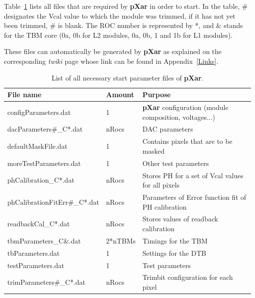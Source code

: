 \documentclass[a4paper,12pt,twoside]{article}
\begin{document}
\begin{appendices}
Table~\ref{StartParameters} lists all files that are required by \textbf{pXar} in order to start. In the table, \# designates the Vcal value to which the module was trimmed, if it has not yet been trimmed, \# is blank. The ROC number is represented by *, and \& stands for the TBM core (0a, 0b for L2 modules, 0a, 0b, 1 and 1b for L1 modules).

These files can automatically be generated by \textbf{pXar} as explained on the corresponding \textit{twiki} page whose link can be found in Appendix~\ref{Links}.

\begin{table}[h!]
\centering \advance\leftskip-0.9cm
\caption{List of all necessary start parameter files of \textbf{pXar}.}
\label{StartParameters}
\begin{tabular}{@{}lll@{}}
\toprule
File name                     & Amount  & Purpose                                                     \\ \midrule
configParameters.dat          & 1       & \textbf{pXar} configuration (module composition, voltages...) \\
dacParameters\#\_C*.dat       & nRocs   & DAC parameters                                              \\
defaultMaskFile.dat           & 1       & Contains pixels that are to be masked                       \\
moreTestParameters.dat        & 1       & Other test parameters     \\
phCalibration\_C*.dat         & nRocs   & Stores PH for a set of Vcal values  for all pixels          \\
phCalibrationFitErr\#\_C*.dat & nRocs   & Parameters of Error function fit of PH calibration   \\
readbackCal\_C*.dat           & nRocs   & Stores values of readback calibration                       \\
tbmParameters\_C\&.dat       & 2*nTBMs & Timings for the TBM                                         \\
tbParameters.dat              & 1       & Settings for the DTB                                        \\
testParameters.dat            & 1       & Test parameters                                             \\
trimParameters\#\_C*.dat      & nRocs   & Trimbit configuration for each pixel                        \\ \bottomrule
\end{tabular}
\end{table}


\end{appendices}
\end{document}
